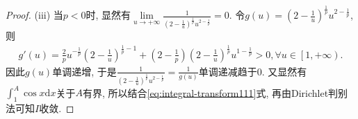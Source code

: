 \documentclass[../../main.tex]{subfiles}
\begin{document}
\begin{proof}
(iii) 当$p<0$时, 显然有$\underset{u\rightarrow +\infty}{\lim}\frac{1}{\left( 2-\frac{1}{u} \right) ^{\frac{1}{p}}u^{2-\frac{1}{p}}}=0$. 令$g\left( u \right) =\left( 2-\frac{1}{u} \right) ^{\frac{1}{p}}u^{2-\frac{1}{p}}$, 则
\begin{align*}
g'\left( u \right) =\frac{2}{p}u^{-\frac{1}{p}}\left( 2-\frac{1}{u} \right) ^{\frac{1}{p}-1}+\left( 2-\frac{1}{p} \right) \left( 2-\frac{1}{u} \right) ^{\frac{1}{p}}u^{1-\frac{1}{p}}>0,\forall u\in \left[ 1,+\infty \right).
\end{align*}
因此$g\left( u \right)$单调递增, 于是$\frac{1}{\left( 2-\frac{1}{u} \right) ^{\frac{1}{p}}u^{2-\frac{1}{p}}}=\frac{1}{g\left( u \right)}$单调递减趋于$0$. 又显然有$\int_1^A{\cos x\mathrm{d}x}$关于$A$有界, 所以结合\eqref{eq:integral-transform111}式, 再由Dirichlet判别法可知$I$收敛.

\end{proof}
\end{document}
